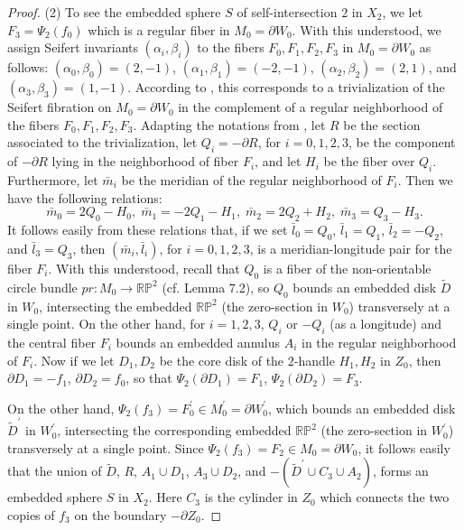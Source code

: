 \documentclass[11pt]{amsart}
\theoremstyle{plain}
\numberwithin{theorem}{section}
\theoremstyle{definition}
\newcommand{\R}{{\mathbb R}}
\renewcommand{\P}{{\mathbb P}}
\begin{document}
\begin{proof}
(2) To see the embedded sphere $S$ of self-intersection $2$ in $X_2$, we let $F_3=
\Psi_2(f_0)$ which is a regular fiber in $M_0=\partial W_0$. With this understood, we assign 
Seifert invariants $(\alpha_i,\beta_i)$ to the fibers $F_0,F_1,F_2,F_3$ in $M_0=\partial W_0$ as follows: $(\alpha_0,\beta_0)=(2,-1)$, $(\alpha_1,\beta_1)=(-2,-1)$, $(\alpha_2,\beta_2)=(2,1)$,
and $(\alpha_3,\beta_3)=(1,-1)$. According to \cite{N}, this corresponds to a trivialization of
the Seifert fibration on $M_0=\partial W_0$ in the complement of a regular neighborhood of the
fibers $F_0,F_1,F_2,F_3$. Adapting the notations from \cite{N}, let $R$ be the section associated 
to the trivialization, let $Q_i=-\partial R$, for $i=0,1,2,3$, be the component of $-\partial R$ lying
in the neighborhood of fiber $F_i$, and let $H_i$ be the fiber over $Q_i$. Furthermore, let 
$\bar{m}_i$ be the meridian of the regular neighborhood of $F_i$. Then we have the following 
relations:
$$
\bar{m}_0=2Q_0-H_0, \; \bar{m}_1=-2Q_1-H_1, \; \bar{m}_2=2Q_2+H_2, \; \bar{m}_3=Q_3-H_3.
$$
It follows easily from these relations that, if we set $\bar{l}_0=Q_0$, $\bar{l}_1=Q_1$, 
$\bar{l}_2=-Q_2$, and $\bar{l}_3=Q_3$, then $(\bar{m}_i,\bar{l}_i)$, for $i=0,1,2,3$, is a
meridian-longitude pair for the fiber $F_i$. With this understood, recall that $Q_0$ is a fiber of
the non-orientable circle bundle $pr: M_0\rightarrow \R\P^2$ (cf. Lemma 7.2), so $Q_0$ bounds
an embedded disk $\tilde{D}$ in $W_0$, intersecting the embedded $\R\P^2$ (the zero-section in
$W_0$) transversely at a single point. On the other hand, for $i=1,2,3$, $Q_i$ or $-Q_i$ (as a longitude) and the central fiber $F_i$ bounds an embedded annulus $A_i$ in the regular 
neighborhood of $F_i$. Now if we let $D_1,D_2$ be the core disk of the $2$-handle $H_1,H_2$
in $Z_0$, then $\partial D_1=-f_1$, $\partial D_2=f_0$, so that $\Psi_2(\partial D_1)=F_1$,
$\Psi_2(\partial D_2)=F_3$. 

On the other hand, $\Psi_2(f_3)=F_0^\prime\in M_0^\prime=\partial W_0^\prime$, which bounds an
embedded disk $\tilde{D}^\prime$ in $W_0^\prime$, intersecting the corresponding embedded 
$\R\P^2$ (the zero-section in $W_0^\prime$) transversely at a single point. Since 
$\Psi_2(f_3)=F_2\in M_0=\partial W_0$, it follows easily that the union of $\tilde{D}$, $R$, 
$A_1\cup D_1$, $A_3\cup D_2$, and $-(\tilde{D}^\prime\cup C_3\cup A_2)$, forms an embedded 
sphere $S$ in $X_2$. Here $C_3$ is the cylinder in $Z_0$ which connects the two copies of $f_3$
on the boundary $-\partial Z_0$. 


\end{proof}
\end{document}
